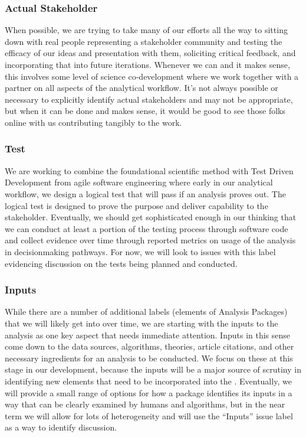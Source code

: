 \documentclass[letterpaper,10pt,english]{sphinxmanual}
\begin{document}
\subsubsection{Actual Stakeholder}
\label{\detokenize{baps:actual-stakeholder}}
When possible, we are trying to take many of our efforts all the way to sitting down with real people representing a stakeholder community and testing the efficacy of our ideas and presentation with them, soliciting critical feedback, and incorporating that into future iterations. Whenever we can and it makes sense, this involves some level of science co-development where we work together with a partner on all aspects of the analytical workflow. It’s not always possible or necessary to explicitly identify actual stakeholders and may not be appropriate, but when it can be done and makes sense, it would be good to see those folks online with us contributing tangibly to the work.


\subsubsection{Test}
\label{\detokenize{baps:test}}
We are working to combine the foundational scientific method with Test Driven Development from agile software engineering where early in our analytical workflow, we design a logical test that will pass if an analysis proves out. The logical test is designed to prove the purpose and deliver capability to the stakeholder. Eventually, we should get sophisticated enough in our thinking that we can conduct at least a portion of the testing process through software code and collect evidence over time through reported metrics on usage of the analysis in decisionmaking pathways. For now, we will look to issues with this label evidencing discussion on the tests being planned and conducted.


\subsubsection{Inputs}
\label{\detokenize{baps:inputs}}
While there are a number of additional labels (elements of Analysis Packages) that we will likely get into over time, we are starting with the inputs to the analysis as one key aspect that needs immediate attention. Inputs in this sense come down to the data sources, algorithms, theories, article citations, and other necessary ingredients for an analysis to be conducted. We focus on these at this stage in our development, because the inputs will be a major source of scrutiny in identifying new elements that need to be incorporated into the {\hyperref[\detokenize{bis:bis}]{}}. Eventually, we will provide a small range of options for how a package identifies its inputs in a way that can be clearly examined by humans and algorithms, but in the near term we will allow for lots of heterogeneity and will use the “Inputs” issue label as a way to identify discussion.
\end{document}
